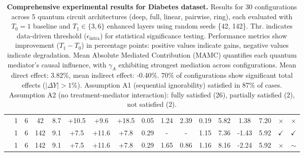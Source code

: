 \documentclass[
    reprint,
    amsmath, amssymb,
    aps,
    floatfix,
    nofootinbib
]{revtex4-1}
\begin{document}
\begin{table}[h!]
{\begin{tabular}{l|cc|c|c|ccc|cccc|ccc|cc}
 & 1 & 6 & 42 & 8.7 & +10.5 & +9.6 & +18.5 & 0.05 & 1.24 & 2.39 & 0.19 & 5.82 & 1.38 & 7.20 & $\times$ & $\times$ \\
 & 1 & 6 & 142 & 9.1 & +7.5 & +11.6 & +7.8 & 0.29 & - & - & 1.15 & 7.36 & -1.43 & 5.92 & $\checkmark$ & $\checkmark$ \\
 & 1 & 6 & 142 & 9.1 & +7.5 & +11.6 & +7.8 & 0.29 & 1.65 & 0.86 & 1.16 & 8.16 & -2.24 & 5.92 & $\times$ & $\sim$ \\
\bottomrule
\hline
\end{tabular}
}
\caption{\textbf{Comprehensive experimental results for Diabetes dataset.} Results for 30 configurations across 5 quantum circuit architectures (deep, full, linear, pairwise, ring), each evaluated with $T_0=1$ baseline and $T_1\in \{3,6\}$ enhanced layers using random seeds \{42, 142\}. Thr. indicates data-driven threshold ($\epsilon_{\text{intra}}$) for statistical significance testing. Performance metrics show improvement ($T_1 - T_0$) in percentage points: positive values indicate gains, negative values indicate degradation. Mean Absolute Mediated Contribution (MAMC) quantifies each quantum mediator's causal influence, with $\gamma_A$ exhibiting strongest mediation across configurations. Mean direct effect: 3.82\%, mean indirect effect: -0.40\%. 70\% of configurations show significant total effects ($|\Delta Y|>1\%$). Assumption A1 (sequential ignorability) satisfied in 87\% of cases. Assumption A2 (no treatment-mediator interaction): fully satisfied (26), partially satisfied (2), not satisfied (2).}
\label{tab:diabetes_comprehensive}
\end{table}
\end{document}
